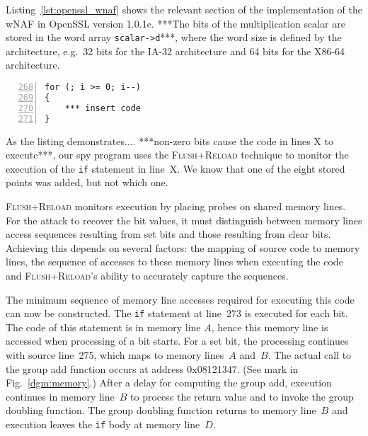\documentclass[twocolumn]{article}
\newcommand{\fl}{\textsc{Flu\-sh+\allowbreak Re\-load}\xspace}
\begin{document}
Listing~\ref{lst:openssl_wnaf} shows the relevant section of the implementation of the wNAF in OpenSSL version 1.0.1e.
***The bits of the multiplication scalar are stored in the word array \texttt{scalar->d}***, where the word size is defined by the architecture, e.g.\ 32 bits for the IA-32 architecture and 64 bits for the X86-64 architecture.


\begin{lstlisting}[numbers=left,firstnumber=268,float=htb,caption=OpenSSL implementation of the wNAF sliding window,label=lst:openssl_wnaf]
for (; i >= 0; i--)
{
    *** insert code
}
\end{lstlisting}

As the listing demonstrates.... ***non-zero bits cause the code in lines X to execute***, our spy program uses the \fl technique to monitor the execution of the \texttt{if} statement in line~X. We know that one of the eight stored points was added, but not which one. 

\fl monitors execution by placing probes on shared memory lines.
For the attack to recover the bit values, it must distinguish between memory lines access sequences
resulting from set bits and those resulting from clear bits.
Achieving this depends on several factors: the mapping of source code to memory lines, 
the sequence of accesses to these memory lines when executing the code and 
\fl's ability to accurately capture the sequences.






The minimum sequence of memory line accesses required for executing this code can now be constructed.
The \texttt{if} statement at line~273 is executed for each bit.  
The code of this statement is in memory line $A$, hence this memory line is accessed when processing of a bit starts.
For a set bit, the processing continues with source line~275, which maps to memory lines~$A$ and~$B$.
The actual call to the group add function occurs at address 0x08121347.
(See mark in Fig.~\ref{dgm:memory}.)
After a delay for computing the group add, execution continues in memory line~$B$ to process the return value and 
to invoke the group doubling function.
The group doubling function returns to memory line~$B$ and execution leaves the \texttt{if} body at memory line~$D$.
\end{document}
